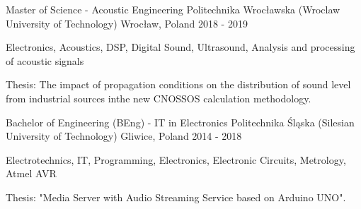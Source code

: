 
\begin{cventries}

  \cventry
  {Master of Science - Acoustic Engineering} %
  {Politechnika Wrocławska (Wroclaw University of Technology)} %
  {Wrocław, Poland} %
  {2018 - 2019} %
  {
    \begin{cvitems} %
      \item {Electronics, Acoustics, DSP, Digital Sound, Ultrasound, Analysis and processing of acoustic signals}
      \item {Thesis: The impact of propagation conditions on the distribution of sound level from industrial sources inthe new CNOSSOS calculation methodology.}
    \end{cvitems}
  }

  \cventry
  {Bachelor of Engineering (BEng) - IT in Electronics} %
  {Politechnika Śląska (Silesian University of Technology)} %
  {Gliwice, Poland} %
  {2014 - 2018} %
  {
    \begin{cvitems} %
      \item {Electrotechnics, IT, Programming, Electronics, Electronic Circuits, Metrology, Atmel AVR}
      \item {Thesis: "Media Server with Audio Streaming Service based on Arduino UNO".}
    \end{cvitems}
  }

\end{cventries}
